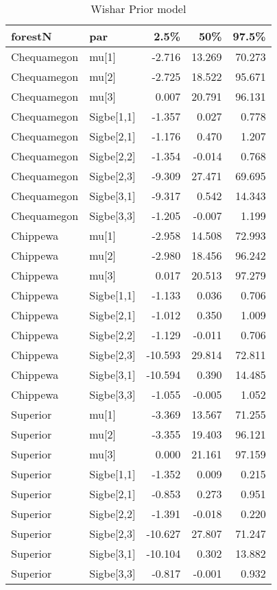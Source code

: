 \begin{table}[ht]
\begin{center}
\begin{tabular}{llrrr}
  \hline
forestN & par & 2.5\% & 50\% & 97.5\% \\ 
  \hline
Chequamegon & mu[1] & -2.716 & 13.269 & 70.273 \\ 
  Chequamegon & mu[2] & -2.725 & 18.522 & 95.671 \\ 
  Chequamegon & mu[3] & 0.007 & 20.791 & 96.131 \\ 
  Chequamegon & Sigbe[1,1] & -1.357 & 0.027 & 0.778 \\ 
  Chequamegon & Sigbe[2,1] & -1.176 & 0.470 & 1.207 \\ 
  Chequamegon & Sigbe[2,2] & -1.354 & -0.014 & 0.768 \\ 
  Chequamegon & Sigbe[2,3] & -9.309 & 27.471 & 69.695 \\ 
  Chequamegon & Sigbe[3,1] & -9.317 & 0.542 & 14.343 \\ 
  Chequamegon & Sigbe[3,3] & -1.205 & -0.007 & 1.199 \\ 
  Chippewa & mu[1] & -2.958 & 14.508 & 72.993 \\ 
  Chippewa & mu[2] & -2.980 & 18.456 & 96.242 \\ 
  Chippewa & mu[3] & 0.017 & 20.513 & 97.279 \\ 
  Chippewa & Sigbe[1,1] & -1.133 & 0.036 & 0.706 \\ 
  Chippewa & Sigbe[2,1] & -1.012 & 0.350 & 1.009 \\ 
  Chippewa & Sigbe[2,2] & -1.129 & -0.011 & 0.706 \\ 
  Chippewa & Sigbe[2,3] & -10.593 & 29.814 & 72.811 \\ 
  Chippewa & Sigbe[3,1] & -10.594 & 0.390 & 14.485 \\ 
  Chippewa & Sigbe[3,3] & -1.055 & -0.005 & 1.052 \\ 
  Superior & mu[1] & -3.369 & 13.567 & 71.255 \\ 
  Superior & mu[2] & -3.355 & 19.403 & 96.121 \\ 
  Superior & mu[3] & 0.000 & 21.161 & 97.159 \\ 
  Superior & Sigbe[1,1] & -1.352 & 0.009 & 0.215 \\ 
  Superior & Sigbe[2,1] & -0.853 & 0.273 & 0.951 \\ 
  Superior & Sigbe[2,2] & -1.391 & -0.018 & 0.220 \\ 
  Superior & Sigbe[2,3] & -10.627 & 27.807 & 71.247 \\ 
  Superior & Sigbe[3,1] & -10.104 & 0.302 & 13.882 \\ 
  Superior & Sigbe[3,3] & -0.817 & -0.001 & 0.932 \\ 
   \hline
\end{tabular}
\caption{Wishar Prior model}
\end{center}
\end{table}
